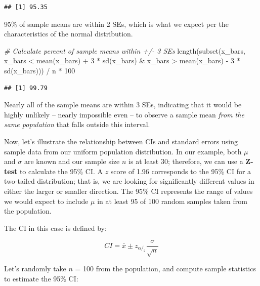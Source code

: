\documentclass[
]{book}
\newenvironment{Shaded}{\begin{snugshade}}{\end{snugshade}}
\newcommand{\CommentTok}[1]{\textcolor[rgb]{0.56,0.35,0.01}{\textit{#1}}}
\newcommand{\DecValTok}[1]{\textcolor[rgb]{0.00,0.00,0.81}{#1}}
\newcommand{\FunctionTok}[1]{\textcolor[rgb]{0.00,0.00,0.00}{#1}}
\newcommand{\NormalTok}[1]{#1}
\newcommand{\SpecialCharTok}[1]{\textcolor[rgb]{0.00,0.00,0.00}{#1}}
\begin{document}
\begin{verbatim}
## [1] 95.35
\end{verbatim}

95\% of sample means are within 2 SEs, which is what we expect per the characteristics of the normal distribution.

\begin{Shaded}
\begin{Highlighting}[]
\CommentTok{\# Calculate percent of sample means within +/{-} 3 SEs}
\FunctionTok{length}\NormalTok{(}\FunctionTok{subset}\NormalTok{(x\_bars, x\_bars }\SpecialCharTok{\textless{}} \FunctionTok{mean}\NormalTok{(x\_bars) }\SpecialCharTok{+} \DecValTok{3} \SpecialCharTok{*} \FunctionTok{sd}\NormalTok{(x\_bars) }\SpecialCharTok{\&}\NormalTok{ x\_bars }\SpecialCharTok{\textgreater{}} \FunctionTok{mean}\NormalTok{(x\_bars) }\SpecialCharTok{{-}} \DecValTok{3} \SpecialCharTok{*} \FunctionTok{sd}\NormalTok{(x\_bars))) }\SpecialCharTok{/}\NormalTok{ n }\SpecialCharTok{*} \DecValTok{100}
\end{Highlighting}
\end{Shaded}

\begin{verbatim}
## [1] 99.79
\end{verbatim}

Nearly all of the sample means are within 3 SEs, indicating that it would be highly unlikely -- nearly impossible even -- to observe a sample mean \emph{from the same population} that falls outside this interval.

Now, let's illustrate the relationship between CIs and standard errors using sample data from our uniform population distribution. In our example, both \(\mu\) and \(\sigma\) are known and our sample size \(n\) is at least 30; therefore, we can use a \textbf{Z-test} to calculate the 95\% CI. A \(z\) score of 1.96 corresponds to the 95\% CI for a two-tailed distribution; that is, we are looking for significantly different values in either the larger or smaller direction. The 95\% CI represents the range of values we would expect to include \(\mu\) in at least 95 of 100 random samples taken from the population.

The CI in this case is defined by:

\[ CI = \bar{x} \pm z_{\alpha/_2} \frac{\sigma}{\sqrt{n}} \]

Let's randomly take \(n\) = 100 from the population, and compute sample statistics to estimate the 95\% CI:
\end{document}
